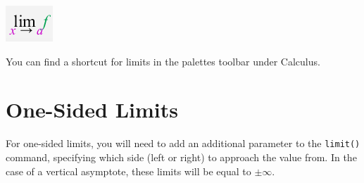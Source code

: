 \begin{marginfigure}
\centering
\includegraphics[scale=0.8]{tutorials/figures/palettelimit.png}
\caption{You can find a shortcut for limits in the palettes toolbar under Calculus.}
\end{marginfigure}

\section{One-Sided Limits}
\label{sec:one_sided_limits}

For one-sided limits, you will need to add an additional parameter to the \texttt{limit()} command, specifying which side (left or right) to approach the value from. In the case of a vertical asymptote, these limits will be equal to $\pm \infty$.

\begin{maplegroup}
\begin{mapleinput}
\end{mapleinput}
\mapleresult
\begin{maplelatex}
\end{maplelatex}
\end{maplegroup}

\begin{maplegroup}
\begin{mapleinput}
\end{mapleinput}
\mapleresult
{}
\end{maplegroup}

\begin{maplegroup}
\begin{mapleinput}
\end{mapleinput}
\mapleresult
\begin{maplelatex}
\end{maplelatex}
\end{maplegroup}

